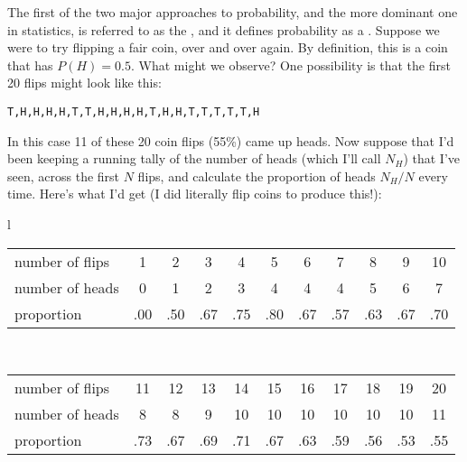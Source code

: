 The first of the two major approaches to probability, and the more dominant one in statistics, is referred to as the , and it defines probability as a . Suppose we were to try flipping a fair coin, over and over again. By definition, this is a coin that has $P(H) = 0.5$. What might we observe? One possibility is that the first 20 flips might look like this:
\begin{verbatim}
T,H,H,H,H,T,T,H,H,H,H,T,H,H,T,T,T,T,T,H
\end{verbatim}
In this case 11 of these 20 coin flips (55\%) came up heads. Now suppose that I'd been keeping a running tally of the number of heads (which I'll call $N_H$) that I've seen, across the first $N$ flips, and calculate the proportion of heads $N_H / N$ every time. Here's what I'd get (I did literally flip coins to produce this!):
\begin{center}
\begin{tabular}{l}
\begin{tabular}{l|cccccccccc}
number of flips &1 & 2 & 3 & 4 & 5 & 6 & 7 & 8 & 9 & 10 \\
number of heads & 0 & 1 & 2 & 3 & 4 & 4 & 4 & 5 & 6 & 7  \\ \hline
proportion    & .00 & .50 & .67 & .75 & .80 & .67 & .57 & .63 & .67 & .70 \\
\end{tabular} \vspace*{12pt}
\\
\begin{tabular}{l|cccccccccc}
number of flips & 11 & 12 & 13 & 14 & 15 & 16 & 17 & 18 & 19 & 20 \\
number of heads & 8  &  8 &  9 & 10 & 10 & 10 & 10 & 10 & 10 & 11 \\ \hline
proportion & .73 & .67 & .69 & .71 & .67 &  .63 & .59 & .56 & .53 & .55\\
\end{tabular}
\end{tabular}
\end{center}
